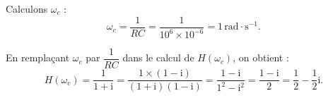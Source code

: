 \medskip

Calculons $\omega_c$ :
\[\omega_c = \dfrac{1}{R C} = \dfrac{1}{10^{6} \times 10^{-6}} = 1 \, \mathrm{rad \cdot s^{-1}}.\]

En remplaçant $\omega_c$ par $\dfrac{1}{R C}$ dans le calcul de $H(\omega_c)$, on obtient :
\[H(\omega_c) = \dfrac{1}{1 + \text{i}} 
= \dfrac{1 \times (1 - \text{i})}{(1 + \text{i})(1 - \text{i})} 
= \dfrac{1 - \text{i}}{1^2 - \text{i}^2}
= \dfrac{1 - \text{i}}{2}
= \dfrac{1}{2} - \dfrac{1}{2} \text{i}.\]

\bigskip
